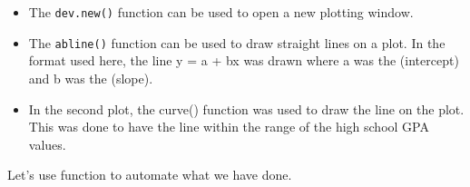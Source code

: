 \documentclass[
]{book}
\newenvironment{Shaded}{\begin{snugshade}}{\end{snugshade}}
\newcommand{\AttributeTok}[1]{\textcolor[rgb]{0.77,0.63,0.00}{#1}}
\newcommand{\CommentTok}[1]{\textcolor[rgb]{0.56,0.35,0.01}{\textit{#1}}}
\newcommand{\ConstantTok}[1]{\textcolor[rgb]{0.00,0.00,0.00}{#1}}
\newcommand{\DecValTok}[1]{\textcolor[rgb]{0.00,0.00,0.81}{#1}}
\newcommand{\FunctionTok}[1]{\textcolor[rgb]{0.00,0.00,0.00}{#1}}
\newcommand{\NormalTok}[1]{#1}
\newcommand{\SpecialCharTok}[1]{\textcolor[rgb]{0.00,0.00,0.00}{#1}}
\newcommand{\StringTok}[1]{\textcolor[rgb]{0.31,0.60,0.02}{#1}}
\begin{document}
\begin{Shaded}
\end{Shaded}

\begin{itemize}
\item
  The \texttt{dev.new()} function can be used to open a new plotting window.
\item
  The \texttt{abline()} function can be used to draw straight lines on a plot. In the format used here, the line y = a + bx was drawn where a was the (intercept) and b was the (slope).
\item
  In the second plot, the curve() function was used to draw the line on the plot. This was done to have the line within the range of the high school GPA values.
\end{itemize}

Let's use function to automate what we have done.
\end{document}
